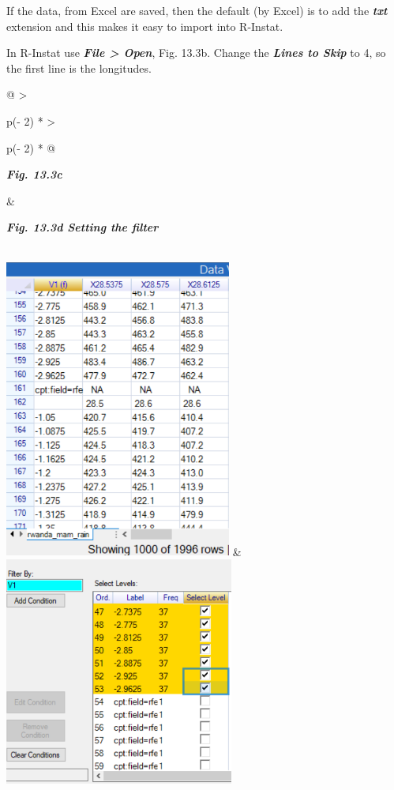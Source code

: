 \documentclass[
  letterpaper,
  DIV=11,
  numbers=noendperiod]{scrreprt}
\begin{document}
If the data, from Excel are saved, then the default (by Excel) is to add
the \textbf{\emph{txt}} extension and this makes it easy to import into
R-Instat.

In R-Instat use \textbf{\emph{File \textgreater{} Open}}, Fig. 13.3b.
Change the \textbf{\emph{Lines to Skip}} to 4, so the first line is the
longitudes.

\begin{longtable}[]{@{}
  >{\raggedright\arraybackslash}p{(\columnwidth - 2\tabcolsep) * }
  >{\raggedright\arraybackslash}p{(\columnwidth - 2\tabcolsep) * }@{}}
\toprule\noalign{}
\begin{minipage}[b]{\linewidth}\raggedright
\textbf{\emph{Fig. 13.3c}}
\end{minipage} & \begin{minipage}[b]{\linewidth}\raggedright
\textbf{\emph{Fig. 13.3d Setting the filter}}
\end{minipage} \\
\midrule\noalign{}
\endhead
\bottomrule\noalign{}
\endlastfoot
\includegraphics[width=2.93866in,height=3.87341in]{figures/Fig13.3c.png}
&
\includegraphics[width=2.97186in,height=2.96056in]{figures/Fig13.3d.png} \\
\end{longtable}
\end{document}
